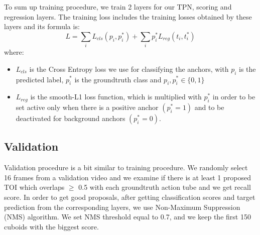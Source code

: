 To sum up training procedure, we train 2 layers for our TPN, scoring and regression layers. The training loss includes the training losses
obtained by these layers and its formula is:
\[ L  =  \sum_iL_{cls}(p_i, p_i^*) + \sum_ip_i^*L_{reg}(t_i,t_i^*) \]
where:
\begin{itemize}
\item $L_{cls} $ is the Cross Entropy loss we use for classifying the anchors, with $p_i$ is the predicted label, $p_i^*$ is the groundtruth class and
  $p_i, p_i^* \in \{0,1\}$
\item $L_{reg} $ is the smooth-L1 loss function, which is multiplied  with $p_i^*$ in order to be set active only when there is a positive anchor $(p_i^* = 1)$
  and to be deactivated for background anchors $(p_i^* = 0)$.
\end{itemize}

\subsection{Validation}

Validation procedure is a bit similar to training procedure.
We randomly select 16 frames from a validation video and we examine if there is at least 1 proposed TOI
which overlaps $\ge$ 0.5 with each groundtruth action tube and we get recall score. 
In order to get good proposals, after getting classification scores and target prediction from the
corresponding layers, we use Non-Maximum Suppression (NMS) algorithm.  We set NMS threshold equal to 0.7,
and we keep the first 150 cuboids with the biggest score.

